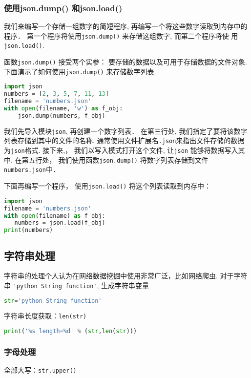 \subsubsection{使用json.dump() 和json.load()}
我们来编写一个存储一组数字的简短程序, 再编写一个将这些数字读取到内存中的程序． 第一个程序将使用\verb|json.dump()| 来存储这组数字, 而第二个程序将使
用\verb|json.load()|.

函数\verb|json.dump()| 接受两个实参： 要存储的数据以及可用于存储数据的文件对象. 下面演示了如何使用\verb|json.dump()| 来存储数字列表.
\begin{lstlisting}[language=python]
import json
numbers = [2, 3, 5, 7, 11, 13]
filename = 'numbers.json'
with open(filename, 'w') as f_obj:
    json.dump(numbers, f_obj)
\end{lstlisting}
我们先导入模块\verb|json|, 再创建一个数字列表． 在第三行处, 我们指定了要将该数字列表存储到其中的文件的名称. 通常使用文件扩展名\verb|.json|来指出文件存储的数据为\verb|json|格式. 接下来,， 我们以写入模式打开这个文件, 让\verb|json| 能够将数据写入其中. 在第五行处， 我们使用函数\verb|json.dump()| 将数字列表存储到文件\verb|numbers.json|中．

下面再编写一个程序， 使用\verb|json.load()| 将这个列表读取到内存中：

\begin{lstlisting}[language=python]
import json
filename = 'numbers.json'
with open(filename) as f_obj:
   numbers = json.load(f_obj)
print(numbers)
\end{lstlisting}








\subsection{字符串处理}
字符串的处理个人认为在网络数据挖掘中使用非常广泛，比如网络爬虫. 对于字符串 \verb|'python String function'|, 生成字符串变量
\begin{lstlisting}[language=python]
str='python String function'
\end{lstlisting}
字符串长度获取：\verb|len(str)|
\begin{lstlisting}[language=python]
print('%s length=%d' % (str,len(str)))
\end{lstlisting}


\subsubsection{字母处理}
全部大写：\verb|str.upper()|

